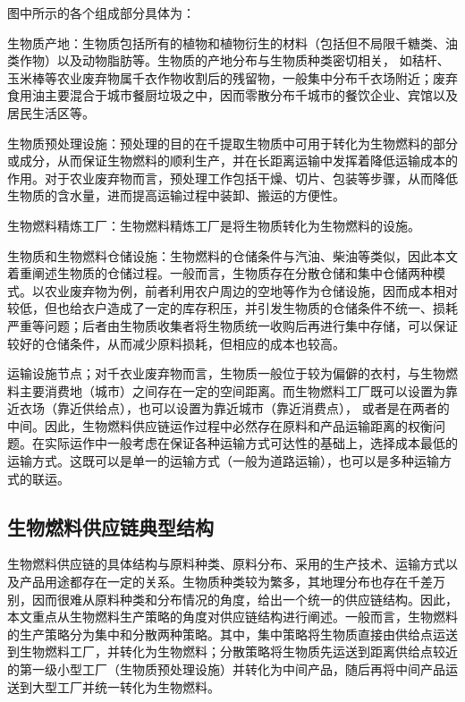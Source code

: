 图中所示的各个组成部分具体为：

\begin{compactitem}
	\item 生物质产地：生物质包括所有的植物和植物衍生的材料（包括但不局限千糖类、油类作物）以及动物脂肪等\cite{An2011}。生物质的产地分布与生物质种类密切相关， 如秸杆、玉米棒等农业废弃物属千衣作物收割后的残留物，一般集中分布千衣场附近；废弃食用油主要混合于城市餐厨垃圾之中，因而零散分布千城市的餐饮企业、宾馆以及居民生活区等。
	
	\item 生物质预处理设施：预处理的目的在千提取生物质中可用于转化为生物燃料的部分或成分，从而保证生物燃料的顺利生产，并在长距离运输中发挥着降低运输成本的作用。对于农业废弃物而言，预处理工作包括干燥、切片、包装等步骤\cite{Gold2011}，从而降低生物质的含水量，进而提高运输过程中装卸、搬运的方便性。
	
	\item 生物燃料精炼工厂：生物燃料精炼工厂是将生物质转化为生物燃料的设施。
	
	\item 生物质和生物燃料仓储设施：生物燃料的仓储条件与汽油、柴油等类似，因此本文着重阐述生物质的仓储过程。一般而言，生物质存在分散仓储和集中仓储两种模式。以农业废弃物为例，前者利用农户周边的空地等作为仓储设施，因而成本相对较低，但也给衣户造成了一定的库存积压，并引发生物质的仓储条件不统一、损耗严重等问题；后者由生物质收集者将生物质统一收购后再进行集中存储，可以保证较好的仓储条件，从而减少原料损耗，但相应的成本也较高。
	
	\item 运输设施节点；对千衣业废弃物而言，生物质一般位于较为偏僻的衣村，与生物燃料主要消费地（城市）之间存在一定的空间距离。而生物燃料工厂既可以设置为靠近衣场（靠近供给点），也可以设置为靠近城市（靠近消费点）， 或者是在两者的中间。因此，生物燃料供应链运作过程中必然存在原料和产品运输距离的权衡问题。在实际运作中一般考虑在保证各种运输方式可达性的基础上，选择成本最低的运输方式。这既可以是单一的运输方式（一般为道路运输），也可以是多种运输方式的联运。
\end{compactitem}

\subsection{生物燃料供应链典型结构}
生物燃料供应链的具体结构与原料种类、原料分布、采用的生产技术、运输方式以及产品用途都存在一定的关系。生物质种类较为繁多，其地理分布也存在千差万别，因而很难从原料种类和分布情况的角度，给出一个统一的供应链结构。因此，本文重点从生物燃料生产策略的角度对供应链结构进行阐述。一般而言，生物燃料的生产策略分为集中和分散两种策略\cite{Liu2014}。其中，集中策略将生物质直接由供给点运送到生物燃料工厂，并转化为生物燃料；分散策略将生物质先运送到距离供给点较近的第一级小型工厂（生物质预处理设施）并转化为中间产品，随后再将中间产品运送到大型工厂并统一转化为生物燃料。

